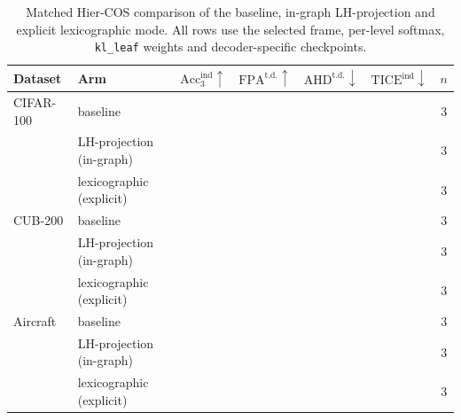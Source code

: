 \begin{table}[htbp]
\centering
\caption{Matched Hier-COS comparison of the baseline, in-graph LH-projection
and explicit lexicographic mode. All rows use the selected frame, per-level
softmax, \texttt{kl\_leaf} weights and decoder-specific checkpoints.}
\label{tab:results_lhproj}
\resulttablesetup
\begin{tabularx}{\linewidth}{@{}L{2.0cm}L{4.0cm}|C|C|C|C|C@{}}
\toprule
\textbf{Dataset} & \textbf{Arm} & $\mathrm{Acc}_3^{\text{ind}}\uparrow$ & $\mathrm{FPA}^{\text{t.d.}}\uparrow$ & $\mathrm{AHD}^{\text{t.d.}}\downarrow$ & $\mathrm{TICE}^{\text{ind}}\downarrow$ & $n$ \\
\midrule
CIFAR-100 & baseline                 &  &  &  &  & 3 \\
          & LH-projection (in-graph) &  &  &  &  & 3 \\
          & lexicographic (explicit) &  &  &  &  & 3 \\
\midrule
CUB-200   & baseline                 &  &  &  &  & 3 \\
          & LH-projection (in-graph) &  &  &  &  & 3 \\
          & lexicographic (explicit) &  &  &  &  & 3 \\
\midrule
Aircraft  & baseline                 &  &  &  &  & 3 \\
          & LH-projection (in-graph) &  &  &  &  & 3 \\
          & lexicographic (explicit) &  &  &  &  & 3 \\
\bottomrule
\end{tabularx}
\end{table}


